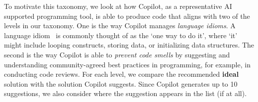To motivate this taxonomy, we look at how Copilot, as a representative AI supported programming tool, is able to produce code that aligns with two of the levels in our taxonomy. 
One is the way Copilot manages \emph{language idioms}.
A language idiom~\cite{Alexandru2018} is commonly thought of as the `one way to do it', where `it' might include looping constructs, storing data, or initializing data structures.
The second is the way Copilot is able to \emph{prevent code smells} by suggesting and understanding community-agreed best practices in programming, for example, in conducting code reviews.
For each level, we compare the recommended \textbf{ideal} solution with the solution Copilot suggests. Since Copilot generates up to 10 suggestions, we also consider where the suggestion appears in the list (if at all). 